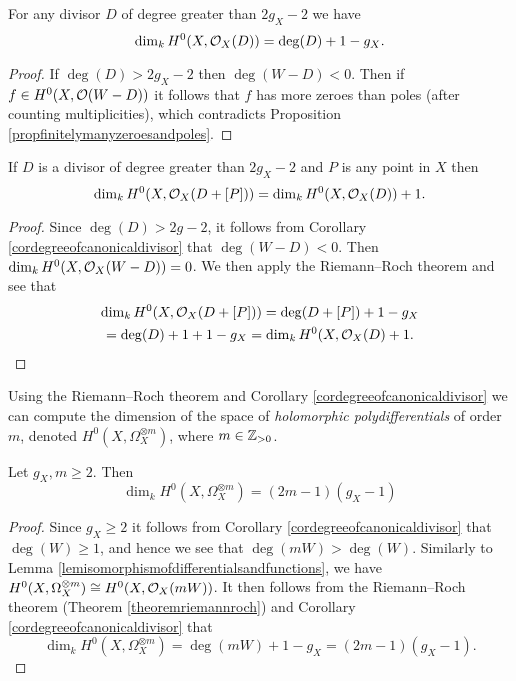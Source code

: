     \begin{cor}
    For any divisor $D$ of degree greater than $2g_X - 2$ we have
        \[
        \dim_kH^0(X,{\cal O}_X(D)) = \deg(D) + 1 - g_X.
        \]
    \end{cor}
    \begin{proof}
    If $\deg(D) > 2g_X -2$ then $\deg(W - D) < 0$.
    Then if $f \in H^0(X,{\cal O}(W-D))$ it follows that $f$ has more zeroes than poles (after counting multiplicities), which contradicts Proposition \ref{propfinitelymanyzeroesandpoles}.
    \end{proof}
    \begin{cor}
    If $D$ is a divisor of degree greater than $2g_X-2$ and $P$ is any point in $X$ then
        \[
        \dim_k H^0(X,{\cal O}_X(D +[P])) = \dim_k H^0(X,{\cal O}_X(D)) + 1.
        \]
    \end{cor}
    \begin{proof}
    Since $\deg(D) > 2g-2$, it follows from Corollary \ref{cordegreeofcanonicaldivisor} that $\deg(W-D) <0$.
    Then $\dim_kH^0(X,{\cal O}_X(W - D))  = 0$.
    We then apply the Riemann--Roch theorem and see that
        \begin{multline*}
        \dim_k H^0(X,{\cal O}_X(D + [P])) = \deg(D +[P]) + 1 - g_X \\ = \deg(D) + 1 + 1 - g_X = \dim_k H^0(X,{\cal O}_X(D) + 1.
        \end{multline*}
    \end{proof}

Using the Riemann--Roch theorem and Corollary \ref{cordegreeofcanonicaldivisor} we can compute the dimension of the space of \emph{holomorphic polydifferentials} of order $m$, denoted $H^0(X,\Omega_X^{\otimes m})$, where $m \in {\mathbb Z}_{> 0}$.

    \begin{cor}\label{dim3}
    Let $g_X, m\geq 2$. Then
        \begin{equation*}
        \dim_kH^0(X,\Omega_X^{\otimes m}) = (2m-1)(g_X-1) 
        \end{equation*}
    \end{cor}
    \begin{proof}
    Since $g_X\geq 2$ it follows from Corollary \ref{cordegreeofcanonicaldivisor} that $\deg(W)\geq1$, and hence we see that $\deg(mW)>\deg(W)$.
    Similarly to Lemma \ref{lemisomorphismofdifferentialsandfunctions}, we have $H^0(X,\Omega_X^{\otimes m}) \cong H^0(X,{\cal O}_X(mW))$.
    It then follows from the Riemann--Roch theorem (Theorem \ref{theoremriemannroch}) and Corollary \ref{cordegreeofcanonicaldivisor} that
        \[
        \dim_kH^0(X,\Omega_X^{\otimes m})=\deg(mW)+1-g_X=(2m-1)(g_X-1).
        \]
    \end{proof}


